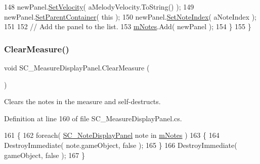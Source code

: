\begin{DoxyCode}
148             newPanel.\hyperlink{group___s_c___n_d_p_unity_ga8a2fef715606caa884c7b490850fb9b7}{SetVelocity}( aMelodyVelocity.ToString() );
149             newPanel.\hyperlink{group___s_c___n_d_p_unity_gae642b50484b9c7fb2bd3b201aeef726c}{SetParentContainer}( \textcolor{keyword}{this} );
150             newPanel.\hyperlink{group___s_c___n_d_p_unity_gaf3160e3686e44e7718768242438ea1cc}{SetNoteIndex}( aNoteIndex );
151 
152             \textcolor{comment}{// Add the panel to the list.}
153             \hyperlink{group___s_c___m_d_p_priv_var_gaf8a533bce87e58d8f7a1da88f476ac6f}{mNotes}.Add( newPanel );
154         \}
155     \}
\end{DoxyCode}
\mbox{\label{group___s_c___m_d_p_pub_func_ga5c4379bcb1309f70b7406eb6523c6179}} 
\subsubsection{\texorpdfstring{Clear\+Measure()}{ClearMeasure()}}
{\footnotesize\ttfamily void S\+C\+\_\+\+Measure\+Display\+Panel.\+Clear\+Measure (\begin{DoxyParamCaption}{ }\end{DoxyParamCaption})}



Clears the notes in the measure and self-\/destructs. 



Definition at line 160 of file S\+C\+\_\+\+Measure\+Display\+Panel.\+cs.


\begin{DoxyCode}
161     \{
162         \textcolor{keywordflow}{foreach}( \hyperlink{class_s_c___note_display_panel}{SC\_NoteDisplayPanel} note \textcolor{keywordflow}{in} \hyperlink{group___s_c___m_d_p_priv_var_gaf8a533bce87e58d8f7a1da88f476ac6f}{mNotes} )
163         \{
164             DestroyImmediate( note.gameObject, \textcolor{keyword}{false} );
165         \}
166         DestroyImmediate( gameObject, \textcolor{keyword}{false} );
167     \}
\end{DoxyCode}
\mbox{\label{group___s_c___m_d_p_pub_func_ga334c177603c25d6206b7c7b639281b07}} 
